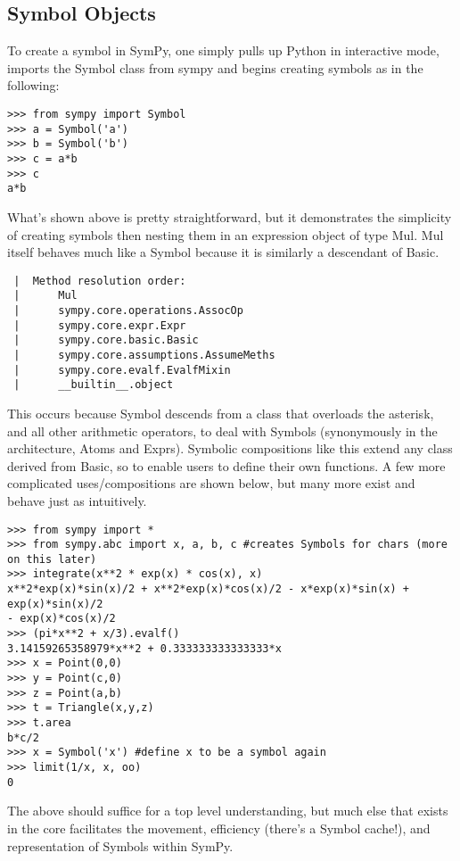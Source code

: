 \documentclass[11pt,a4paper,oneside]{report}
\begin{document}
\subsection*{\small Symbol Objects}
To create a symbol in SymPy, one simply pulls up Python in interactive mode, imports the Symbol class from sympy and begins creating symbols as in the following:
\begin{verbatim}
>>> from sympy import Symbol
>>> a = Symbol('a')
>>> b = Symbol('b')
>>> c = a*b
>>> c
a*b
\end{verbatim}
What's shown above is pretty straightforward, but it demonstrates the simplicity of creating symbols then nesting them in an expression object of type Mul. Mul itself behaves much like a Symbol because it is similarly a descendant of Basic.
\begin{verbatim}
 |  Method resolution order:
 |      Mul
 |      sympy.core.operations.AssocOp
 |      sympy.core.expr.Expr
 |      sympy.core.basic.Basic
 |      sympy.core.assumptions.AssumeMeths
 |      sympy.core.evalf.EvalfMixin
 |      __builtin__.object
\end{verbatim}
This occurs because Symbol descends from a class that overloads the asterisk, and all other arithmetic operators, to deal with Symbols (synonymously in the architecture, Atoms and Exprs). Symbolic compositions like this extend any class derived from Basic, so to enable users to define their own functions. A few more complicated uses/compositions are shown below, but many more exist and behave just as intuitively.
\begin{verbatim}
>>> from sympy import *
>>> from sympy.abc import x, a, b, c #creates Symbols for chars (more on this later)
>>> integrate(x**2 * exp(x) * cos(x), x)
x**2*exp(x)*sin(x)/2 + x**2*exp(x)*cos(x)/2 - x*exp(x)*sin(x) + exp(x)*sin(x)/2 
- exp(x)*cos(x)/2
>>> (pi*x**2 + x/3).evalf()
3.14159265358979*x**2 + 0.333333333333333*x
>>> x = Point(0,0)
>>> y = Point(c,0)
>>> z = Point(a,b)
>>> t = Triangle(x,y,z)
>>> t.area
b*c/2
>>> x = Symbol('x') #define x to be a symbol again
>>> limit(1/x, x, oo)
0
\end{verbatim}
The above should suffice for a top level understanding, but much else that exists in the core facilitates the movement, efficiency (there's a Symbol cache!), and representation of Symbols within SymPy.
\end{document}
